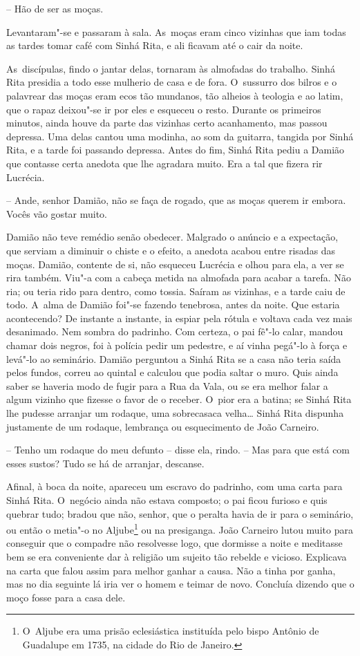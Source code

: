 -- Hão de ser as moças.

Levantaram"-se e passaram à sala. As~moças eram cinco vizinhas que iam
todas as tardes tomar café com Sinhá Rita, e ali ficavam até o cair da
noite.

As~discípulas, findo o jantar delas, tornaram às almofadas do trabalho.
Sinhá Rita presidia a todo esse mulherio de casa e de fora. O~sussurro
dos bilros e o palavrear das moças eram ecos tão mundanos, tão alheios à
teologia e ao latim, que o rapaz deixou"-se ir por eles e esqueceu o
resto. Durante os primeiros minutos, ainda houve da parte das vizinhas
certo acanhamento, mas passou depressa. Uma delas cantou uma modinha, ao
som da guitarra, tangida por Sinhá Rita, e a tarde foi passando
depressa. Antes do fim, Sinhá Rita pediu a Damião que contasse certa
anedota que lhe agradara muito. Era a tal que fizera rir Lucrécia.

-- Ande, senhor Damião, não se faça de rogado, que as moças querem ir
embora. Vocês vão gostar muito.

Damião não teve remédio senão obedecer. Malgrado o anúncio e a
expectação, que serviam a diminuir o chiste e o efeito, a anedota acabou
entre risadas das moças. Damião, contente de si, não esqueceu Lucrécia e
olhou para ela, a ver se rira também. Viu"-a com a cabeça metida na
almofada para acabar a tarefa. Não ria; ou teria rido para dentro, como
tossia. Saíram as vizinhas, e a tarde caiu de todo. A~alma de Damião
foi"-se fazendo tenebrosa, antes da noite. Que estaria acontecendo? De
instante a instante, ia espiar pela rótula e voltava cada vez mais
desanimado. Nem sombra do padrinho. Com certeza, o pai fê"-lo calar,
mandou chamar dois negros, foi à polícia pedir um pedestre, e aí vinha
pegá"-lo à força e levá"-lo ao seminário. Damião perguntou a Sinhá Rita se
a casa não teria saída pelos fundos, correu ao quintal e calculou que
podia saltar o muro. Quis ainda saber se haveria modo de fugir para a
Rua da Vala, ou se era melhor falar a algum vizinho que fizesse o favor
de o receber. O~pior era a batina; se Sinhá Rita lhe pudesse arranjar um
rodaque, uma sobrecasaca velha\ldots{} Sinhá Rita dispunha justamente de um
rodaque, lembrança ou esquecimento de João Carneiro.

-- Tenho um rodaque do meu defunto -- disse ela, rindo. -- Mas para que
está com esses sustos? Tudo se há de arranjar, descanse.

Afinal, à boca da noite, apareceu um escravo do padrinho, com uma carta
para Sinhá Rita. O~negócio ainda não estava composto; o pai ficou
furioso e quis quebrar tudo; bradou que não, senhor, que o peralta havia
de ir para o seminário, ou então o metia"-o no Aljube\footnote{O~Aljube
  era uma prisão eclesiástica instituída pelo bispo Antônio de Guadalupe
  em 1735, na cidade do Rio de Janeiro.} ou na presiganga. João Carneiro
lutou muito para conseguir que o compadre não resolvesse logo, que
dormisse a noite e meditasse bem se era conveniente dar à religião um
sujeito tão rebelde e vicioso. Explicava na carta que falou assim para
melhor ganhar a causa. Não a tinha por ganha, mas no dia seguinte lá
iria ver o homem e teimar de novo. Concluía dizendo que o moço fosse
para a casa dele.

